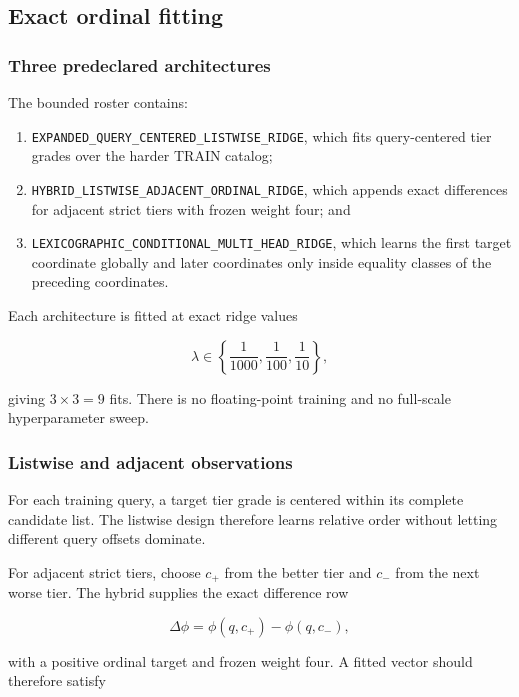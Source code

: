 \subsection{Exact ordinal fitting}\label{viii-ch07-exact-ordinal-fitting}

\subsubsection{Three predeclared
architectures}\label{viii-ch07-three-predeclared-architectures}

The bounded roster contains:

\begin{enumerate}
\def\labelenumi{\arabic{enumi}.}
\tightlist
\item
  \nolinkurl{EXPANDED_QUERY_CENTERED_LISTWISE_RIDGE}, which fits
  query-centered tier grades over the harder TRAIN catalog;
\item
  \nolinkurl{HYBRID_LISTWISE_ADJACENT_ORDINAL_RIDGE}, which appends
  exact differences for adjacent strict tiers with frozen weight four;
  and
\item
  \nolinkurl{LEXICOGRAPHIC_CONDITIONAL_MULTI_HEAD_RIDGE}, which learns
  the first target coordinate globally and later coordinates only inside
  equality classes of the preceding coordinates.
\end{enumerate}

Each architecture is fitted at exact ridge values

\[
\lambda\in\left\{\frac1{1000},\frac1{100},\frac1{10}\right\},
\]

giving \(3\times3=9\) fits. There is no floating-point training and no
full-scale hyperparameter sweep.

\subsubsection{Listwise and adjacent
observations}\label{viii-ch07-listwise-and-adjacent-observations}

For each training query, a target tier grade is centered within its
complete candidate list. The listwise design therefore learns relative
order without letting different query offsets dominate.

For adjacent strict tiers, choose \(c_+\) from the better tier and
\(c_-\) from the next worse tier. The hybrid supplies the exact
difference row

\[
\Delta\phi=\phi(q,c_+)-\phi(q,c_-),
\]

with a positive ordinal target and frozen weight four. A fitted vector
should therefore satisfy

